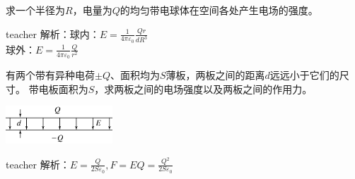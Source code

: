 \begin{example}
求一个半径为$R$，电量为$Q$的均匀带电球体在空间各处产生电场的强度。
\begin{taggedblock}{teacher}
\newline
解析：球内：$E=\frac{1}{4\pi\varepsilon_0}\frac{Qr}{dR^3}$
\\球外：$E=\frac{1}{4\pi\varepsilon_0}\frac{Q}{r^2}$
\end{taggedblock}
\end{example}




\begin{example}
有两个带有异种电荷$\pm Q$、面积均为$S$薄板，两板之间的距离$d$远远小于它们的尺寸。
带电板面积为$S$，求两板之间的电场强度以及两板之间的作用力。
\begin{flushright}
\includegraphics[width=0.3\textwidth]{images/elec-problem-4.pdf}
\end{flushright}
\begin{taggedblock}{teacher}
\noindent
解析：$E=\frac{Q}{2S\varepsilon_0},F=EQ=\frac{Q^2}{2S\varepsilon_0}$
\end{taggedblock}
\end{example}

